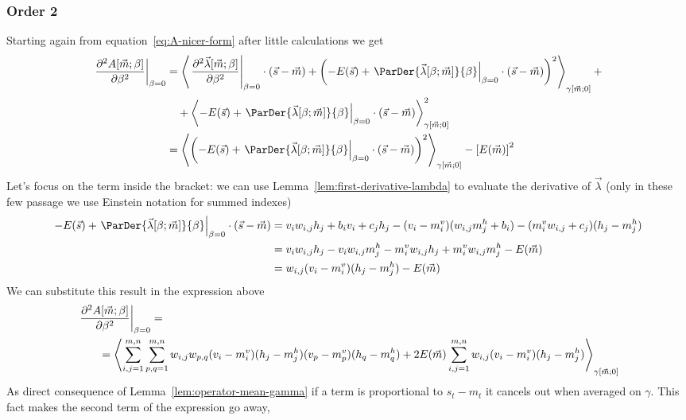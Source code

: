 \subsubsection{Order 2}
Starting again from equation~\eqref{eq:A-nicer-form} after little calculations we get
\begin{align*}
  \left.\frac{\partial^2A{\left[\vec{m};\beta\right]}}{\partial\beta^2}\right|_{\beta=0}
  &= \Gmean{
       \left.\frac{\partial^2\vec{\lambda}{\left[\vec{m};\beta\right]}}{\partial\beta^2}\right|_{\beta=0}
         \cdot (\vec{s}-\vec{m})
       +\left(-E{(\vec{s})} +   
          \left.\ParDer{\Lambd{\beta}{\vec{m}}}{\beta}\right|_{\beta=0}\cdot(\vec{s}-\vec{m})\right)^2
     }{\vec{m}}{0}+\\
  &\quad+ \Gmean{
          -E{(\vec{s})}+\left.\ParDer{\Lambd{\beta}{\vec{m}}}{\beta}\right|_{\beta=0}\cdot(\vec{s}-\vec{m})
       }{\vec{m}}{0}^2 \\
  &= \Gmean{
       \left(-E{(\vec{s})} +   
        \left.\ParDer{\Lambd{\beta}{\vec{m}}}{\beta}\right|_{\beta=0}\cdot(\vec{s}-\vec{m})\right)^2
     }{\vec{m}}{0} - \left[E{(\vec{m})}\right]^2
\end{align*}
Let's focus on the term inside the bracket: we can use Lemma~\ref{lem:first-derivative-lambda}
to evaluate the derivative of \(\vec{\lambda}\) (only in these few passage we use Einstein notation
for summed indexes)
\begin{align*}
  -E{(\vec{s})} + \left.\ParDer{\Lambd{\beta}{\vec{m}}}{\beta}\right|_{\beta=0}\cdot(\vec{s}-\vec{m})
  &= v_iw_{i,j}h_j +b_iv_i+c_jh_j - (v_i-\mvi)(w_{i,j}\mhj +b_i) - (\mvi w_{i,j}+c_j)(h_j-\mhj) \\
  &= v_iw_{i,j}h_j - v_i w_{i,j} \mhj - \mvi w_{i,j} h_j + \mvi w_{i,j} \mhj - E{(\vec{m})}\\
  &= w_{i,j} (v_i-\mvi)(h_j-\mhj) - E{(\vec{m})}
\end{align*}
We can substitute this result in the expression above
\begin{align*}
  &\left.\frac{\partial^2A{\left[\vec{m};\beta\right]}}{\partial\beta^2}\right|_{\beta=0}=\\
  &\qquad= \left\langle
      \sum_{i,j=1}^{m,n}\sum_{p,q=1}^{m,n} w_{i,j} w_{p,q}(v_i-m_i^v)(h_j-m_j^h)(v_p-m_p^v)(h_q-m_q^h)
      +2E{(\vec{m})}\sum_{i,j=1}^{m,n}w_{i,j}(v_i-m_i^v)(h_j-m_j^h)
    \right\rangle_{\gamma{\left[\vec{m};0\right]}}
\end{align*}
As direct consequence of Lemma~\ref{lem:operator-mean-gamma} if a term is proportional to \(s_t-m_t\)
it cancels out when averaged on \(\gamma\). This fact makes the second term of the expression go away,
